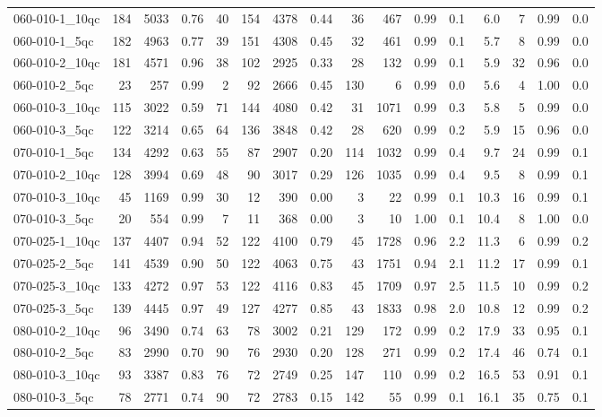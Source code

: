 \documentclass[twoside]{article}
\begin{document}
\begin{longtable}{l|rrrr|rrrr|rrr|rrrr}
		060-010-1\_10qc & 184 & 5033 & 0.76 & 40 & 154 & 4378 & 0.44 & 36 & 467 & 0.99 & 0.1 & 6.0 & 7 & 0.99 & 0.0 \\
		060-010-1\_5qc & 182 & 4963 & 0.77 & 39 & 151 & 4308 & 0.45 & 32 & 461 & 0.99 & 0.1 & 5.7 & 8 & 0.99 & 0.0 \\
		060-010-2\_10qc & 181 & 4571 & 0.96 & 38 & 102 & 2925 & 0.33 & 28 & 132 & 0.99 & 0.1 & 5.9 & 32 & 0.96 & 0.0 \\
		060-010-2\_5qc & 23 & 257 & 0.99 & 2 & 92 & 2666 & 0.45 & 130 & 6 & 0.99 & 0.0 & 5.6 & 4 & 1.00 & 0.0 \\
		060-010-3\_10qc & 115 & 3022 & 0.59 & 71 & 144 & 4080 & 0.42 & 31 & 1071 & 0.99 & 0.3 & 5.8 & 5 & 0.99 & 0.0 \\
		060-010-3\_5qc & 122 & 3214 & 0.65 & 64 & 136 & 3848 & 0.42 & 28 & 620 & 0.99 & 0.2 & 5.9 & 15 & 0.96 & 0.0 \\
		070-010-1\_5qc & 134 & 4292 & 0.63 & 55 & 87 & 2907 & 0.20 & 114 & 1032 & 0.99 & 0.4 & 9.7 & 24 & 0.99 & 0.1 \\
		070-010-2\_10qc & 128 & 3994 & 0.69 & 48 & 90 & 3017 & 0.29 & 126 & 1035 & 0.99 & 0.4 & 9.5 & 8 & 0.99 & 0.1 \\
		070-010-3\_10qc & 45 & 1169 & 0.99 & 30 & 12 & 390 & 0.00 & 3 & 22 & 0.99 & 0.1 & 10.3 & 16 & 0.99 & 0.1 \\
		070-010-3\_5qc & 20 & 554 & 0.99 & 7 & 11 & 368 & 0.00 & 3 & 10 & 1.00 & 0.1 & 10.4 & 8 & 1.00 & 0.0 \\
		070-025-1\_10qc & 137 & 4407 & 0.94 & 52 & 122 & 4100 & 0.79 & 45 & 1728 & 0.96 & 2.2 & 11.3 & 6 & 0.99 & 0.2 \\
		070-025-2\_5qc & 141 & 4539 & 0.90 & 50 & 122 & 4063 & 0.75 & 43 & 1751 & 0.94 & 2.1 & 11.2 & 17 & 0.99 & 0.1 \\
		070-025-3\_10qc & 133 & 4272 & 0.97 & 53 & 122 & 4116 & 0.83 & 45 & 1709 & 0.97 & 2.5 & 11.5 & 10 & 0.99 & 0.2 \\
		070-025-3\_5qc & 139 & 4445 & 0.97 & 49 & 127 & 4277 & 0.85 & 43 & 1833 & 0.98 & 2.0 & 10.8 & 12 & 0.99 & 0.2 \\
		080-010-2\_10qc & 96 & 3490 & 0.74 & 63 & 78 & 3002 & 0.21 & 129 & 172 & 0.99 & 0.2 & 17.9 & 33 & 0.95 & 0.1 \\
		080-010-2\_5qc & 83 & 2990 & 0.70 & 90 & 76 & 2930 & 0.20 & 128 & 271 & 0.99 & 0.2 & 17.4 & 46 & 0.74 & 0.1 \\
		080-010-3\_10qc & 93 & 3387 & 0.83 & 76 & 72 & 2749 & 0.25 & 147 & 110 & 0.99 & 0.2 & 16.5 & 53 & 0.91 & 0.1 \\
		080-010-3\_5qc & 78 & 2771 & 0.74 & 90 & 72 & 2783 & 0.15 & 142 & 55 & 0.99 & 0.1 & 16.1 & 35 & 0.75 & 0.1 \\

\end{longtable}
\end{document}
